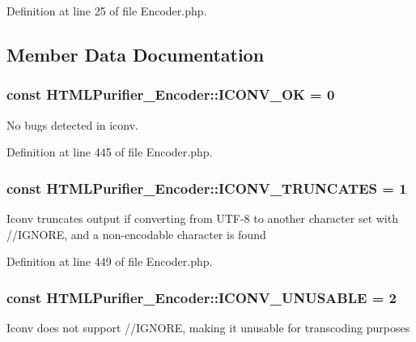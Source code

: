 Definition at line 25 of file Encoder.\+php.



\subsection{Member Data Documentation}
\hypertarget{classHTMLPurifier__Encoder_abee6de7ca542a201ad9bd1ff762d4b6d}{
\subsubsection[{I\+C\+O\+N\+V\+\_\+\+O\+K}]{\setlength{\rightskip}{0pt plus 5cm}const H\+T\+M\+L\+Purifier\+\_\+\+Encoder\+::\+I\+C\+O\+N\+V\+\_\+\+O\+K = 0}}\label{classHTMLPurifier__Encoder_abee6de7ca542a201ad9bd1ff762d4b6d}
No bugs detected in iconv. 

Definition at line 445 of file Encoder.\+php.

\hypertarget{classHTMLPurifier__Encoder_a275b2fb955a479eff7f6a4cdd49fdaf4}{
\subsubsection[{I\+C\+O\+N\+V\+\_\+\+T\+R\+U\+N\+C\+A\+T\+E\+S}]{\setlength{\rightskip}{0pt plus 5cm}const H\+T\+M\+L\+Purifier\+\_\+\+Encoder\+::\+I\+C\+O\+N\+V\+\_\+\+T\+R\+U\+N\+C\+A\+T\+E\+S = 1}}\label{classHTMLPurifier__Encoder_a275b2fb955a479eff7f6a4cdd49fdaf4}
Iconv truncates output if converting from U\+T\+F-\/8 to another character set with //\+I\+G\+N\+O\+R\+E, and a non-\/encodable character is found 

Definition at line 449 of file Encoder.\+php.

\hypertarget{classHTMLPurifier__Encoder_abba31caaa72f5cd8639d96326af31e4d}{
\subsubsection[{I\+C\+O\+N\+V\+\_\+\+U\+N\+U\+S\+A\+B\+L\+E}]{\setlength{\rightskip}{0pt plus 5cm}const H\+T\+M\+L\+Purifier\+\_\+\+Encoder\+::\+I\+C\+O\+N\+V\+\_\+\+U\+N\+U\+S\+A\+B\+L\+E = 2}}\label{classHTMLPurifier__Encoder_abba31caaa72f5cd8639d96326af31e4d}
Iconv does not support //\+I\+G\+N\+O\+R\+E, making it unusable for transcoding purposes 

